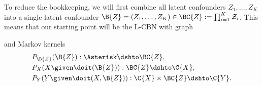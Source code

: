 To reduce the bookkeeping, 
we will first combine all latent confounders $Z_1,\dots,Z_K$ into a single latent confounder
$\B{Z} = (Z_1,\dots,Z_K) \in \BC{Z} :=  \prod_{i=1}^K \mathcal{Z}_i$.
This means that our starting point will be the L-CBN with graph
\begin{center}\end{center}
and Markov kernels 
\begin{align*}
  & P_{\B{Z}}(\B{Z}) : \Asterisk \dshto \BC{Z}, \\
  & P_X(X \given \doit(\B{Z})) : \BC{Z} \dshto \C{X}, \\
  & P_Y(Y \given \doit(X,\B{Z})) : \C{X} \times \BC{Z} \dshto \C{Y}.
\end{align*}

